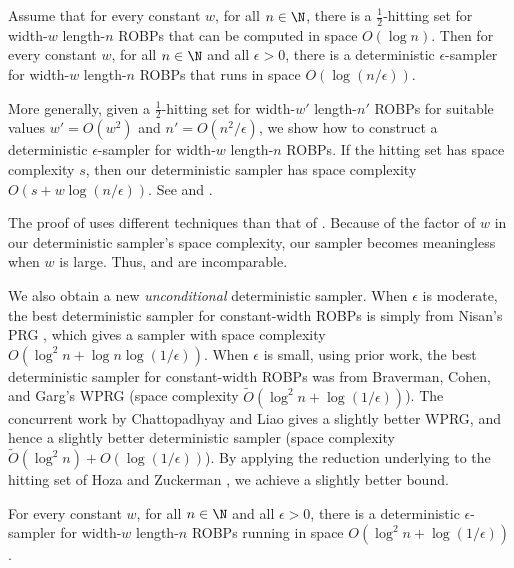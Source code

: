 \begin{theorem} \label{thm:const-width-main}
Assume that for every constant $w$, for all $n \in \N$, there is a $\frac{1}{2}$-hitting set for width-$w$ length-$n$ ROBPs that can be computed in space $O(\log n)$. Then for every constant $w$, for all $n \in \N$ and all $\epsilon > 0$, there is a deterministic $\epsilon$-sampler for width-$w$ length-$n$ ROBPs that runs in space $O(\log(n/\epsilon))$.
\end{theorem}

More generally, given a $\frac{1}{2}$-hitting set for width-$w'$ length-$n'$ ROBPs for suitable values $w' = O(w^2)$ and $n' = O(n^2/\epsilon)$, we show how to construct a deterministic $\epsilon$-sampler for width-$w$ length-$n$ ROBPs. If the hitting set has space complexity $s$, then our deterministic sampler has space complexity $O(s + w \log(n/\epsilon))$. See  and .

The proof of  uses different techniques than that of . Because of the factor of $w$ in our deterministic sampler's space complexity, our sampler becomes meaningless when $w$ is large. Thus,  and  are incomparable.

We also obtain a new \emph{unconditional} deterministic sampler. When $\epsilon$ is moderate, the best deterministic sampler for constant-width ROBPs is simply from Nisan's PRG \cite{Nis92}, which gives a sampler with space complexity $O(\log^2 n + \log n \log(1/\epsilon))$. When $\epsilon$ is small, using prior work, the best deterministic sampler for constant-width ROBPs was from Braverman, Cohen, and Garg's WPRG \cite{BCG20} (space complexity $\widetilde{O}(\log^2 n + \log(1/\epsilon))$). The concurrent work by Chattopadhyay and Liao \cite{CL20} gives a slightly better WPRG, and hence a slightly better deterministic sampler (space complexity $\widetilde{O}(\log^2 n) + O(\log(1/\epsilon))$). By applying the reduction underlying  to the hitting set of Hoza and Zuckerman \cite{HZ20}, we achieve a slightly better bound.

\begin{theorem} \label{thm:hz-sampler}
For every constant $w$, for all $n \in \N$ and all $\epsilon > 0$, there is a deterministic $\epsilon$-sampler for width-$w$ length-$n$ ROBPs running in space $O(\log^2 n + \log(1/\epsilon))$.
\end{theorem}

